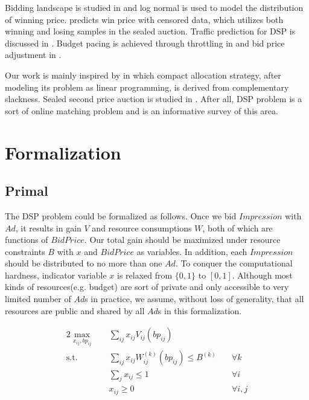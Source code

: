 \documentclass[sigconf]{acmart}
\newcommand{\sumj}{\sum\limits_j}
\newcommand{\sumij}{\sum\limits_{ij}}
\newcommand{\sx}{x_{ij}}
\newcommand{\sbp}{bp_{ij}}
\newcommand{\sV}{V_{ij}}
\newcommand{\sW}{W_{ij}^{(k)}}
\newcommand{\sB}{B^{(k)}}
\newcommand{\dspresourceconstraint}{\sumij \sx \sW(\sbp) \le \sB}
\newcommand{\assignmentconstraint}{\sumj \sx \le 1}
\begin{document}
Bidding landscape is studied in \cite{YingCui2011} and log normal is used to model the distribution of winning price.
\cite{Wu2015} predicts win price with censored data, which utilizes both winning and losing samples in the sealed auction.
Traffic prediction for DSP is discussed in \cite{Traffic2016}.
Budget pacing is achieved through throttling in \cite{Throttle2015} and bid price adjustment in \cite{Pacing2013}.

Our work is mainly inspired by \cite{YeChen2011} in which compact allocation strategy,
    after modeling its problem as linear programming, is derived from complementary slackness.
Sealed second price auction is studied in \cite{SSPA1961}.
After all, DSP problem is a sort of online matching problem and \cite{Mehta} is an informative survey of this area.

\section{Formalization} \label{Formalization}

\subsection{Primal}

The DSP problem could be formalized as follows.
Once we bid $Impression$ with $Ad$, it results in gain $V$ and resource consumptions $W$, both of which are functions of $BidPrice$.
Our total gain should be maximized under resource constraints $B$ with $x$ and $BidPrice$ as variables.
In addition, each $Impression$ should be distributed to no more than one $Ad$.
To conquer the computational hardness, indicator variable $x$ is relaxed from $\{0, 1\}$ to $[0, 1]$.
Although most kinds of resources(e.g. budget) are sort of private and only accessible to very limited number of $Ad$s in practice,
    we assume, without loss of generality, that all resources are public and shared by all $Ad$s in this formalization.

\begin{alignat}{2}
    \max\limits_{\sx, \sbp} \quad & \sumij \sx \sV(\sbp) \quad    & {} \\
    \mbox{s.t.} \quad             & \dspresourceconstraint \quad  & \forall k \\
    \quad                         & \assignmentconstraint \quad   & \forall i \\
    \quad                         & \sx \ge 0 \quad               & \forall i,j
\end{alignat}
\end{document}
